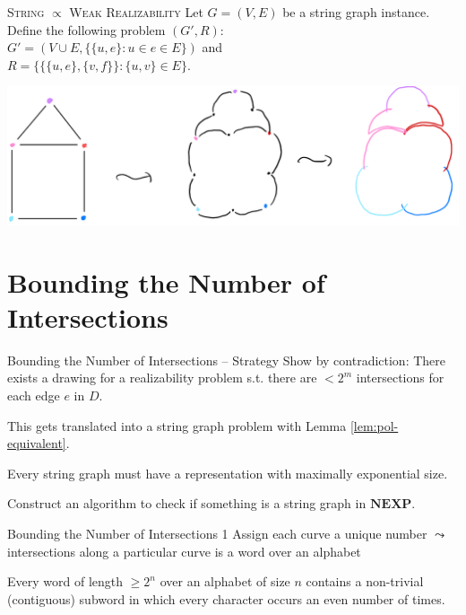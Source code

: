 \documentclass[10pt,aspectratio=169]{beamer}
\theoremstyle{plain}
\newcommand{\set}[1]{\{#1\}}
\begin{document}
\begin{frame}{\textsc{String} \(\propto\) \textsc{Weak Realizability}}
    Let \(G = (V,E)\) be a string graph instance. \pause
    Define the following problem \((G', R)\):\\
    \(G' = (V \cup E, \set{\set{u,e} : u \in e \in E})\) and\\
    \(R = \set{\set{\set{u,e}, \set{v,f}} : \set{u,v} \in E}\).
    \begin{center}
        \includegraphics[height=0.4\textheight]{images/figure-3.pdf}
    \end{center}
\end{frame}

\section{Bounding the Number of Intersections}

\begin{frame}{Bounding the Number of Intersections -- Strategy}
    Show by contradiction: There exists a drawing for a realizability problem 
    s.t. there are \(< 2^m\) intersections for each edge \(e\) in \(D\).\pause

    This gets translated into a string graph problem with Lemma \ref{lem:pol-equivalent}.\pause

    Every string graph must have a representation with maximally exponential size.\pause

    Construct an algorithm to check if something is a string graph in \(\mathbf{NEXP}\).
\end{frame}

\begin{frame}{Bounding the Number of Intersections 1}
    Assign each curve a unique number \(\leadsto\) intersections along a particular curve is a word over an alphabet
    \begin{lemma}
        Every word of length \(\geq 2^n\) over an alphabet of size \(n\) contains a non-trivial (contiguous) subword in which every character occurs an even number of times.
        \label{lem:even-occurrences}
    \end{lemma}
\end{frame}
\end{document}
